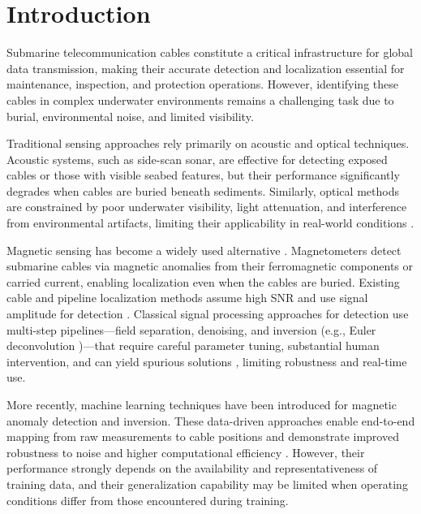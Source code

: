 \section{Introduction}
\label{sec:intro}
Submarine telecommunication cables constitute a critical infrastructure for global data transmission, making their accurate detection and localization essential for maintenance, inspection, and protection operations. However, identifying these cables in complex underwater environments remains a challenging task due to burial, environmental noise, and limited visibility.

Traditional sensing approaches rely primarily on acoustic and optical techniques. Acoustic systems, such as side-scan sonar, are effective for detecting exposed cables or those with visible seabed features, but their performance significantly degrades when cables are buried beneath sediments. Similarly, optical methods are constrained by poor underwater visibility, light attenuation, and interference from environmental artifacts, limiting their applicability in real-world conditions \cite{feng2024prediction,unal2024survey,leblond:hal-02304729}.

Magnetic sensing has become a widely used alternative \cite{oehler2024uuv}. Magnetometers detect submarine cables via magnetic anomalies from their ferromagnetic components or carried current, enabling localization even when the cables are buried. Existing cable and pipeline localization methods assume high SNR and use signal amplitude for detection \cite{Bharti2020,Yu2018,Xiang2016,li2024attitude}. Classical signal processing approaches for detection use multi-step pipelines—field separation, denoising, and inversion (e.g., Euler deconvolution \cite{Thompson1982EULDPHAN,reid2014avoidable})—that require careful parameter tuning, substantial human intervention, and can yield spurious solutions \cite{liu2024submarine}, limiting robustness and real-time use.

More recently, machine learning techniques have been introduced for magnetic anomaly detection and inversion. These data-driven approaches enable end-to-end mapping from raw measurements to cable positions and demonstrate improved robustness to noise and higher computational efficiency \cite{https://doi.org/10.1049/smt2.12084,HU2021106653,liu2024submarine}. However, their performance strongly depends on the availability and representativeness of training data, and their generalization capability may be limited when operating conditions differ from those encountered during training.

